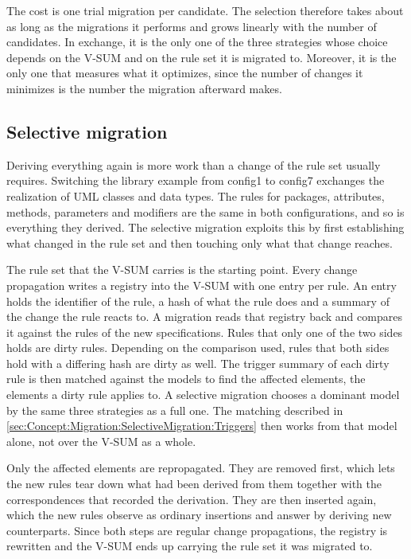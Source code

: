 The cost is one trial migration per candidate.
The selection therefore takes about as long as the migrations it performs and grows linearly with the number of candidates.
In exchange, it is the only one of the three strategies whose choice depends on the V-SUM and on the rule set it is migrated to.
Moreover, it is the only one that measures what it optimizes, since the number of changes it minimizes is the number the migration afterward makes.

\subsection{Selective migration}
\label{sec:Concept:Migration:SelectiveMigration}

Deriving everything again is more work than a change of the rule set usually requires.
Switching the library example from config1 to config7 exchanges the realization of UML classes and data types.
The rules for packages, attributes, methods, parameters and modifiers are the same in both configurations, and so is everything they derived.
The selective migration exploits this by first establishing what changed in the rule set and then touching only what that change reaches.

The rule set that the V-SUM carries is the starting point.
Every change propagation writes a registry into the V-SUM with one entry per rule.
An entry holds the identifier of the rule, a hash of what the rule does and a summary of the change the rule reacts to.
A migration reads that registry back and compares it against the rules of the new specifications.
Rules that only one of the two sides holds are dirty rules.
Depending on the comparison used, rules that both sides hold with a differing hash are dirty as well.
The trigger summary of each dirty rule is then matched against the models to find the affected elements, the elements a dirty rule applies to.
A selective migration chooses a dominant model by the same three strategies as a full one.
The matching described in \autoref{sec:Concept:Migration:SelectiveMigration:Triggers} then works from that model alone, not over the V-SUM as a whole.

Only the affected elements are repropagated.
They are removed first, which lets the new rules tear down what had been derived from them together with the correspondences that recorded the derivation.
They are then inserted again, which the new rules observe as ordinary insertions and answer by deriving new counterparts.
Since both steps are regular change propagations, the registry is rewritten and the V-SUM ends up carrying the rule set it was migrated to.

